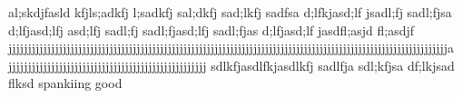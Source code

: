 al;skdjfasld kfjls;adkfj l;sadkfj sal;dkfj sad;lkfj sadfsa d;lfkjasd;lf jsadl;fj sadl;fjsa d;lfjasd;lfj asd;lfj sadl;fj sadl;fjasd;lfj sadl;fjas d;lfjasd;lf jasdfl;asjd fl;asdjf   jjjjjjjjjjjjjjjjjjjjjjjjjjjjjjjjjjjjjjjjjjjjjjjjjjjjjjjjjjjjjjjjjjjjjjjjjjjjjjjjjjjjjjjjjjjjjjjjjjjjjjjjjjjjjjjjja         jjjjjjjjjjjjjjjjjjjjjjjjjjjjjjjjjjjjjjjjjjjjjjjjjjj                                                                                                                                               sdlkfjasdlfkjasdlkfj sadlfja sdl;kfjsa df;lkjsad flksd spankiing good

